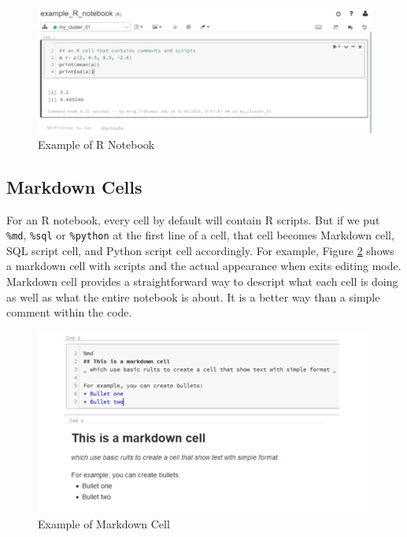 \documentclass[12pt,]{krantz}
\begin{document}
\begin{figure}

{\centering \includegraphics[width=1\linewidth]{images/dbxrnotebook} 

}

\caption{Example of R Notebook}\label{fig:rnotebook}
\end{figure}

\hypertarget{markdown-cells}{%
\subsection{Markdown Cells}\label{markdown-cells}}

For an R notebook, every cell by default will contain R scripts. But if we put \texttt{\%md}, \texttt{\%sql} or \texttt{\%python} at the first line of a cell, that cell becomes Markdown cell, SQL script cell, and Python script cell accordingly. For example, Figure \ref{fig:dbxmarkdown} shows a markdown cell with scripts and the actual appearance when exits editing mode. Markdown cell provides a straightforward way to descript what each cell is doing as well as what the entire notebook is about. It is a better way than a simple comment within the code.

\begin{figure}

{\centering \includegraphics[width=1\linewidth]{images/dbxmarkdown} 

}

\caption{Example of Markdown Cell}\label{fig:dbxmarkdown}
\end{figure}
\end{document}
